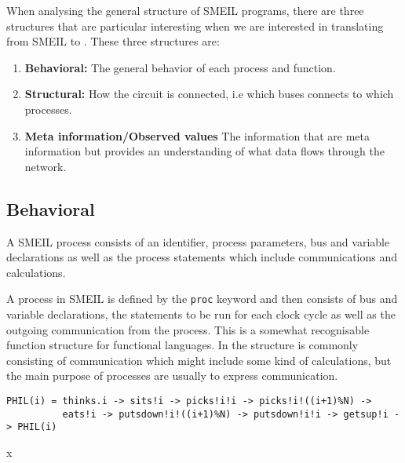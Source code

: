 When analysing the general structure of SMEIL programs, there are three structures that are particular interesting when we are interested in translating from SMEIL to \cspm{}. These three structures are:
\begin{enumerate}
    \item \textbf{Behavioral:} The general behavior of each process and function.
    \item \textbf{Structural:} How the circuit is connected, i.e which buses connects to which processes.
    \item \textbf{Meta information/Observed values} %
    The information that are meta information but provides an understanding of what data flows through the network.
\end{enumerate}


\subsection{Behavioral}

A SMEIL process consists of an identifier, process parameters, bus and variable declarations as well as the process statements which include communications and calculations.

A process in SMEIL is defined by the \texttt{proc} keyword and then consists of bus and variable declarations, the statements to be run for each clock cycle as well as the outgoing communication from the process. This is a somewhat recognisable function structure for functional languages. In \cspm the structure is commonly consisting of communication which might include some kind of calculations, but the main purpose of \cspm processes are usually to express communication. %

\begin{listing}
\begin{verbatim}
PHIL(i) = thinks.i -> sits!i -> picks!i!i -> picks!i!((i+1)%N) ->
          eats!i -> putsdown!i!((i+1)%N) -> putsdown!i!i -> getsup!i -> PHIL(i)

\end{verbatim}
\caption{x}
\label{x}
\end{listing}

